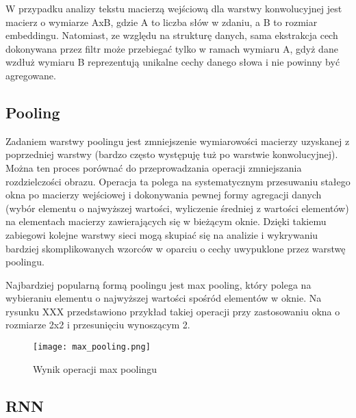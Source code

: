 W przypadku analizy tekstu macierzą wejściową dla warstwy konwolucyjnej jest macierz o wymiarze AxB, gdzie A to liczba słów w zdaniu, a B to rozmiar embeddingu. Natomiast, ze względu na strukturę danych, sama ekstrakcja cech dokonywana przez filtr może przebiegać tylko w ramach wymiaru A, gdyż dane wzdłuż wymiaru B reprezentują unikalne cechy danego słowa i nie powinny być agregowane.


\subsection{Pooling}



Zadaniem warstwy poolingu jest zmniejszenie wymiarowości macierzy uzyskanej z poprzedniej warstwy (bardzo często występuję tuż po warstwie konwolucyjnej). Można ten proces porównać do przeprowadzania operacji zmniejszania rozdzielczości obrazu. Operacja ta polega na systematycznym przesuwaniu stałego okna po macierzy wejściowej i dokonywania pewnej formy agregacji danych (wybór elementu o najwyższej wartości, wyliczenie średniej z wartości elementów) na elementach macierzy zawierających się w bieżącym oknie. Dzięki takiemu zabiegowi kolejne warstwy sieci mogą skupiać się na analizie i wykrywaniu bardziej skomplikowanych wzorców w oparciu o cechy uwypuklone przez warstwę poolingu. 

 

Najbardziej popularną formą poolingu jest max pooling, który polega na wybieraniu elementu o najwyższej wartości spośród elementów w oknie. Na rysunku XXX przedstawiono przykład takiej operacji przy zastosowaniu okna o rozmiarze 2x2 i przesunięciu wynoszącym 2. 

\begin{figure}[!h]
    \label{fig:max_pooling}
    \centering \texttt{[image: max\_pooling.png]}
    \caption{Wynik operacji max poolingu}
\end{figure}


\subsection{RNN}




